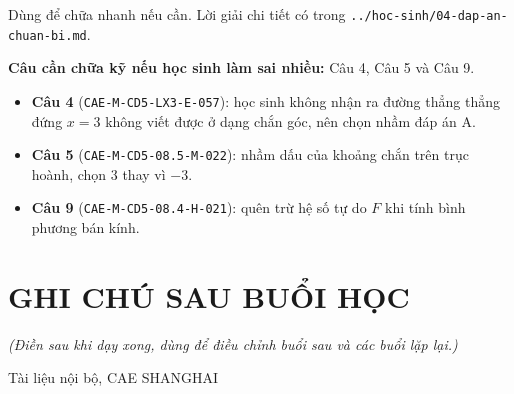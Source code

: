\documentclass[11pt, a4paper]{article}
\begin{document}
Dùng để chữa nhanh nếu cần. Lời giải chi tiết có trong \texttt{../hoc-sinh/04-dap-an-chuan-bi.md}.


\textbf{Câu cần chữa kỹ nếu học sinh làm sai nhiều:} Câu 4, Câu 5 và Câu 9.

\begin{itemize}[leftmargin=1.4em, itemsep=2pt]
\item \textbf{Câu 4} (\texttt{CAE-M-CD5-LX3-E-057}): học sinh không nhận ra đường thẳng thẳng đứng $x = 3$ không viết được ở dạng chắn góc, nên chọn nhầm đáp án A.
\item \textbf{Câu 5} (\texttt{CAE-M-CD5-08.5-M-022}): nhầm dấu của khoảng chắn trên trục hoành, chọn $3$ thay vì $-3$.
\item \textbf{Câu 9} (\texttt{CAE-M-CD5-08.4-H-021}): quên trừ hệ số tự do $F$ khi tính bình phương bán kính.
\end{itemize}

\section{GHI CHÚ SAU BUỔI HỌC}

\emph{(Điền sau khi dạy xong, dùng để điều chỉnh buổi sau và các buổi lặp lại.)}

\vspace{0.8cm}
\begin{center}
{\footnotesize\color{cae_blue} Tài liệu nội bộ, CAE SHANGHAI}
\end{center}
\end{document}
